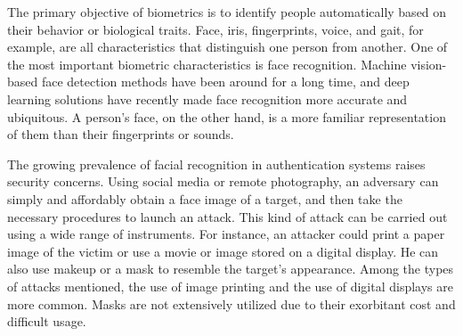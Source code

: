 \documentclass[journal]{IEEEtran}
\begin{document}
The primary objective of biometrics is to identify people automatically based on their behavior or biological traits.
Face, iris, fingerprints, voice, and gait, for example, are all characteristics that distinguish one person from another.
One of the most important biometric characteristics is face recognition.
Machine vision-based face detection methods have been around for a long time, and deep learning solutions have recently made face recognition more accurate and ubiquitous.
A person's face, on the other hand, is a more familiar representation of them than their fingerprints or sounds. 


 

The growing prevalence of facial recognition in authentication systems raises security concerns.
Using social media or remote photography, an adversary can simply and affordably obtain a face image of a target, and then take the necessary procedures to launch an attack. 
This kind of attack can be carried out using a wide range of instruments. For instance, an attacker could print a paper image of the victim or use a movie or image stored on a digital display.
He can also use makeup or a mask to resemble the target's appearance. Among the types of attacks mentioned, the use of image printing and the use of digital displays are more common.
Masks are not extensively utilized due to their exorbitant cost and difficult usage.
\end{document}

